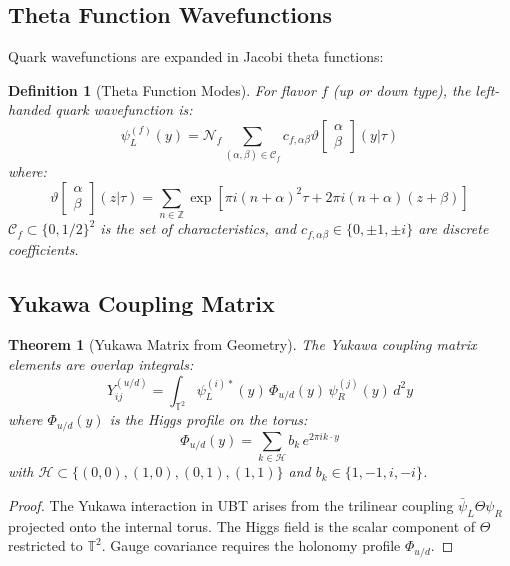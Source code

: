 \documentclass[12pt,a4paper]{article}
\newtheorem{theorem}{Theorem}[section]
\newtheorem{definition}{Definition}[section]
\begin{document}
\subsection{Theta Function Wavefunctions}

Quark wavefunctions are expanded in Jacobi theta functions:

\begin{definition}[Theta Function Modes]
For flavor $f$ (up or down type), the left-handed quark wavefunction is:
\begin{equation}
    \psi_L^{(f)}(y) = \mathcal{N}_f \sum_{(\alpha,\beta) \in \mathcal{C}_f} c_{f,\alpha\beta} \vartheta\left[\begin{array}{c}\alpha\\\beta\end{array}\right](y|\tau)
\end{equation}
where:
\begin{equation}
    \vartheta\left[\begin{array}{c}\alpha\\\beta\end{array}\right](z|\tau) = \sum_{n\in\mathbb{Z}} \exp\left[\pi i (n+\alpha)^2 \tau + 2\pi i (n+\alpha)(z+\beta)\right]
\end{equation}
$\mathcal{C}_f \subset \{0, 1/2\}^2$ is the set of characteristics, and $c_{f,\alpha\beta} \in \{0, \pm 1, \pm i\}$ are discrete coefficients.
\end{definition}

\subsection{Yukawa Coupling Matrix}

\begin{theorem}[Yukawa Matrix from Geometry]
The Yukawa coupling matrix elements are overlap integrals:
\begin{equation}
    Y_{ij}^{(u/d)} = \int_{\mathbb{T}^2} \psi_L^{(i)*}(y) \, \Phi_{u/d}(y) \, \psi_R^{(j)}(y) \, d^2y
\end{equation}
where $\Phi_{u/d}(y)$ is the Higgs profile on the torus:
\begin{equation}
    \Phi_{u/d}(y) = \sum_{k \in \mathcal{H}} b_k \, e^{2\pi i k \cdot y}
\end{equation}
with $\mathcal{H} \subset \{(0,0), (1,0), (0,1), (1,1)\}$ and $b_k \in \{1, -1, i, -i\}$.
\end{theorem}

\begin{proof}
The Yukawa interaction in UBT arises from the trilinear coupling $\bar{\psi}_L \Theta \psi_R$ projected onto the internal torus. The Higgs field is the scalar component of $\Theta$ restricted to $\mathbb{T}^2$. Gauge covariance requires the holonomy profile $\Phi_{u/d}$.
\end{proof}
\end{document}

